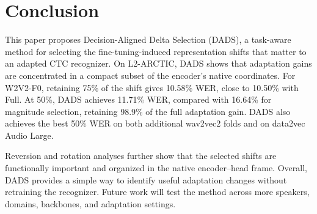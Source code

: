 \documentclass{article}
\begin{document}
\section{Conclusion}
\label{sec:conclusion}
This paper proposes Decision-Aligned Delta Selection (DADS), a task-aware
method for selecting the fine-tuning-induced representation shifts that matter
to an adapted CTC recognizer. On L2-ARCTIC, DADS shows that adaptation gains
are concentrated in a compact subset of the encoder's native coordinates. For
W2V2-F0, retaining 75\% of the shift gives 10.58\% WER, close to 10.50\% with
Full. At 50\%, DADS achieves 11.71\% WER, compared with 16.64\% for magnitude
selection, retaining 98.9\% of the full adaptation gain. DADS also achieves
the best 50\% WER on both additional wav2vec2 folds and on data2vec Audio
Large.

Reversion and rotation analyses further show that the selected shifts are
functionally important and organized in the native encoder--head frame.
Overall, DADS provides a simple way to identify useful adaptation changes
without retraining the recognizer. Future work will test the method across
more speakers, domains, backbones, and adaptation settings.

\clearpage


\end{document}
